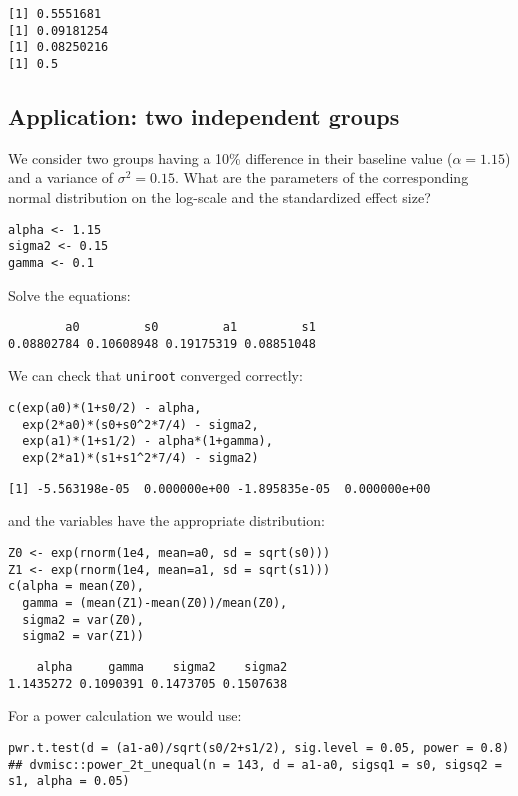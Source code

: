 \documentclass[12pt]{article}
\begin{document}
\begin{verbatim}
[1] 0.5551681
[1] 0.09181254
[1] 0.08250216
[1] 0.5
\end{verbatim}

\subsection{Application: two independent groups}
\label{sec:orgd703435}

We consider two groups having a 10\% difference in their baseline value
(\(\alpha=1.15\)) and a variance of \(\sigma^2 = 0.15\). What are the
parameters of the corresponding normal distribution on the log-scale
and the standardized effect size?
\lstset{language=r,label= ,caption= ,captionpos=b,numbers=none}
\begin{lstlisting}
alpha <- 1.15
sigma2 <- 0.15
gamma <- 0.1
\end{lstlisting}

Solve the equations:
\begin{verbatim}
        a0         s0         a1         s1 
0.08802784 0.10608948 0.19175319 0.08851048
\end{verbatim}

We can check that \texttt{uniroot} converged correctly:
\lstset{language=r,label= ,caption= ,captionpos=b,numbers=none}
\begin{lstlisting}
c(exp(a0)*(1+s0/2) - alpha, 
  exp(2*a0)*(s0+s0^2*7/4) - sigma2, 
  exp(a1)*(1+s1/2) - alpha*(1+gamma), 
  exp(2*a1)*(s1+s1^2*7/4) - sigma2)
\end{lstlisting}

\begin{verbatim}
[1] -5.563198e-05  0.000000e+00 -1.895835e-05  0.000000e+00
\end{verbatim}

and the variables have the appropriate distribution:
\lstset{language=r,label= ,caption= ,captionpos=b,numbers=none}
\begin{lstlisting}
Z0 <- exp(rnorm(1e4, mean=a0, sd = sqrt(s0)))
Z1 <- exp(rnorm(1e4, mean=a1, sd = sqrt(s1)))
c(alpha = mean(Z0), 
  gamma = (mean(Z1)-mean(Z0))/mean(Z0), 
  sigma2 = var(Z0), 
  sigma2 = var(Z1))
\end{lstlisting}

\begin{verbatim}
    alpha     gamma    sigma2    sigma2 
1.1435272 0.1090391 0.1473705 0.1507638
\end{verbatim}

For a power calculation we would use:
\lstset{language=r,label= ,caption= ,captionpos=b,numbers=none}
\begin{lstlisting}
pwr.t.test(d = (a1-a0)/sqrt(s0/2+s1/2), sig.level = 0.05, power = 0.8)
## dvmisc::power_2t_unequal(n = 143, d = a1-a0, sigsq1 = s0, sigsq2 = s1, alpha = 0.05)
\end{lstlisting}
\end{document}

